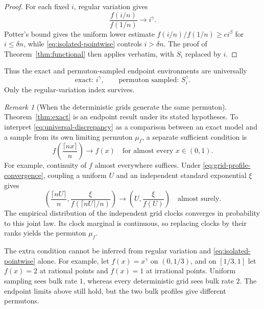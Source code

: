 \documentclass[11pt]{article}
\numberwithin{equation}{section}
\theoremstyle{definition}
\theoremstyle{remark}
\newtheorem{remark}[theorem]{Remark}
\begin{document}
\begin{proof}
For each fixed $i$, regular variation gives
\[
  \frac{f(i/n)}{f(1/n)}\longrightarrow i^\gamma.
\]
Potter's bound gives the uniform lower estimate $f(i/n)/f(1/n)\geq ci^\beta$ for $i\leq\delta n$, while \eqref{eq:isolated-pointwise} controls $i>\delta n$.  The proof of Theorem~\ref{thm:functional} then applies verbatim, with $S_i$ replaced by $i$.
\end{proof}

Thus the exact and permuton-sampled endpoint environments are universally
\begin{equation}
  \boxed{
  \text{exact: }i^\gamma,
  \qquad
  \text{permuton sampled: }S_i^\gamma.
  }
  \label{eq:universal-discrepancy}
\end{equation}
Only the regular-variation index survives.

\begin{remark}[When the deterministic grids generate the same permuton]
\label{rem:exact-grid-permuton}
Theorem~\ref{thm:exact} is an endpoint result under its stated
hypotheses.  To interpret \eqref{eq:universal-discrepancy} as a comparison
between an exact model and a sample from its own limiting permuton
$\mu_f$, a separate sufficient condition is
\begin{equation}
 f\!\left(\frac{\lceil nx\rceil}{n}\right)\longrightarrow f(x)
 \quad\text{for almost every }x\in(0,1).
 \label{eq:grid-profile-convergence}
\end{equation}
For example, continuity of $f$ almost everywhere suffices.
Under \eqref{eq:grid-profile-convergence}, coupling a uniform $U$ and
an independent standard exponential $\xi$ gives
\[
 \left(\frac{\lceil nU\rceil}{n},
       \frac{\xi}{f(\lceil nU\rceil/n)}\right)
 \longrightarrow
 \left(U,\frac{\xi}{f(U)}\right)
 \quad\text{almost surely}.
\]
The empirical distribution of the independent grid clocks converges
in probability to this joint law.  Its clock marginal is continuous,
so replacing clocks by their ranks yields the permuton $\mu_f$.

The extra condition cannot be inferred from regular variation and
\eqref{eq:isolated-pointwise} alone.  For example, let $f(x)=x^\gamma$
on $(0,1/3)$, and on $[1/3,1]$ let $f(x)=2$ at rational points and
$f(x)=1$ at irrational points.  Uniform sampling sees bulk rate $1$,
whereas every deterministic grid sees bulk rate $2$.  The endpoint
limits above still hold, but the two bulk profiles give different
permutons.
\end{remark}
\end{document}
